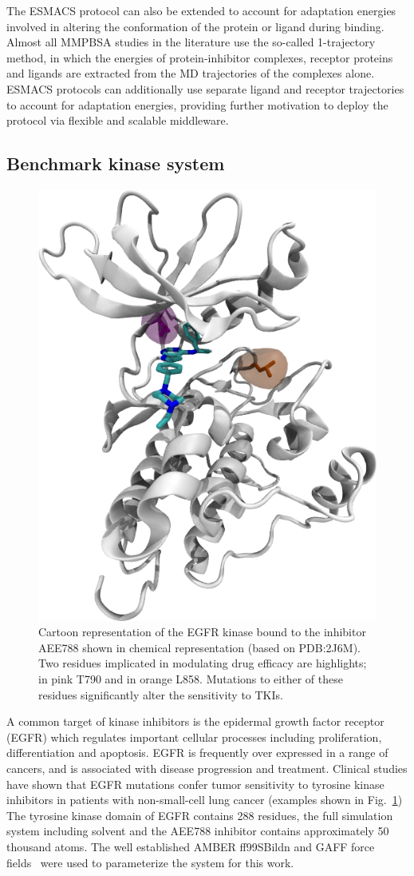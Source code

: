 The ESMACS protocol can also be extended to account for adaptation energies
involved in altering the conformation of the protein or ligand during
binding. Almost all MMPBSA studies in the literature use the so-called
1-trajectory method, in which the energies of protein-inhibitor complexes,
receptor proteins and ligands are extracted from the MD trajectories of the
complexes alone. ESMACS protocols can additionally use separate ligand and
receptor trajectories to account for adaptation energies, providing further
motivation to deploy the protocol via flexible and scalable middleware.

\subsection{Benchmark kinase system}

\begin{figure}
  \centering
  \includegraphics[width=0.60\columnwidth]{FIGURES/egfr.png}
  \caption{Cartoon representation of the EGFR kinase bound to the inhibitor
  AEE788 shown in chemical representation (based on PDB:2J6M). Two residues
  implicated in modulating drug efficacy are highlights; in pink T790 and in
  orange L858. Mutations to either of these residues significantly alter the
  sensitivity to TKIs.}\label{fig:egfr}
\end{figure}


A common target of kinase inhibitors is the epidermal growth factor receptor
(EGFR) which regulates important cellular processes including proliferation,
differentiation and apoptosis. EGFR is frequently over expressed in a range of
cancers, and is associated with disease progression and treatment. Clinical
studies have shown that EGFR mutations confer tumor sensitivity to tyrosine
kinase inhibitors in patients with non-small-cell lung cancer (examples shown
in Fig.~\ref{fig:egfr}) The tyrosine kinase domain of EGFR contains 288
residues, the full simulation system including solvent and the AEE788
inhibitor contains approximately 50 thousand atoms. The well established AMBER
ff99SBildn and GAFF force fields~\cite{Maier2015, Wang2004} were used to
parameterize the system for this work.

